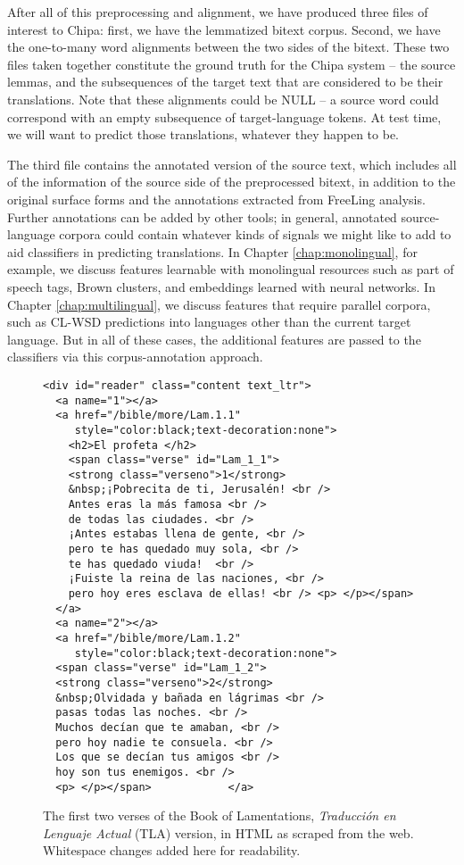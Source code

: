
After all of this preprocessing and alignment, we have produced three files of
interest to Chipa: first, we have the lemmatized bitext corpus. Second, we have
the one-to-many word alignments between the two sides of the bitext. These two
files taken together constitute the ground truth for the Chipa system -- the
source lemmas, and the subsequences of the target text that are considered to
be their translations. Note that these alignments could be NULL -- a source
word could correspond with an empty subsequence of target-language tokens. At
test time, we will want to predict those translations, whatever they happen to
be.

The third file contains the annotated version of the source text, which
includes all of the information of the source side of the preprocessed bitext,
in addition to the original surface forms and the annotations extracted from
FreeLing analysis. Further annotations can be added by other tools; in general,
annotated source-language corpora could contain whatever kinds of signals we
might like to add to aid classifiers in predicting translations. In Chapter
\ref{chap:monolingual}, for example, we discuss features learnable with
monolingual resources such as part of speech tags, Brown clusters, and
embeddings learned with neural networks. In Chapter \ref{chap:multilingual}, we
discuss features that require parallel corpora, such as CL-WSD predictions into
languages other than the current target language. But in all of these cases,
the additional features are passed to the classifiers via this
corpus-annotation approach.

\begin{figure*}
\raggedright \begin{verbatim}
<div id="reader" class="content text_ltr">
  <a name="1"></a>
  <a href="/bible/more/Lam.1.1"
     style="color:black;text-decoration:none">
    <h2>El profeta </h2>
    <span class="verse" id="Lam_1_1">
    <strong class="verseno">1</strong>
    &nbsp;¡Pobrecita de ti, Jerusalén! <br />
    Antes eras la más famosa <br />
    de todas las ciudades. <br />
    ¡Antes estabas llena de gente, <br />
    pero te has quedado muy sola, <br />
    te has quedado viuda!  <br />
    ¡Fuiste la reina de las naciones, <br />
    pero hoy eres esclava de ellas! <br /> <p> </p></span>
  </a>
  <a name="2"></a>
  <a href="/bible/more/Lam.1.2"
     style="color:black;text-decoration:none">
  <span class="verse" id="Lam_1_2">
  <strong class="verseno">2</strong>
  &nbsp;Olvidada y bañada en lágrimas <br />
  pasas todas las noches. <br />
  Muchos decían que te amaban, <br />
  pero hoy nadie te consuela. <br />
  Los que se decían tus amigos <br />
  hoy son tus enemigos. <br />
  <p> </p></span>            </a>
\end{verbatim}
  \caption{The first two verses of the Book of Lamentations, \emph{Traducción en
  Lenguaje Actual} (TLA) version, in HTML as scraped from the web. Whitespace
  changes added here for readability.}
  \label{fig:es-html-sample}
\end{figure*}

